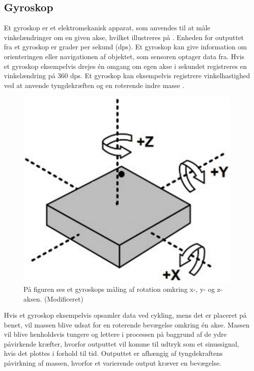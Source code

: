 \subsection{Gyroskop}
Et gyroskop er et elektromekanisk apparat, som anvendes til at måle vinkelændringer om en given akse, hvilket illustreres på . Enheden for outputtet fra et gyroskop er grader per sekund (dps). Et gyroskop kan give information om orienteringen eller navigationen af objektet, som sensoren optager data fra. Hvis et gyroskop eksempelvis drejes én omgang om egen akse i sekundet registreres en vinkelændring på 360 dps. \citep{Sparkfun_gyro,Barbour2014} \newline
Et gyroskop kan eksempelvis registrere vinkelhastighed ved at anvende tyngdekræften og en roterende indre masse \citep{Sparkfun_gyro,Barbour2014}.
\begin{figure}[H]
	\centering
	\includegraphics[scale=0.4]{figures/bProblemloesning/gyro.png}
	\caption{På figuren ses et gyroskops måling af rotation omkring x-, y- og z-aksen. \citep{Sparkfun_gyro} (Modificeret)}
	\label{fig:gyro}
\end{figure}\vspace{-.25cm}
Hvis et gyroskop eksempelvis opsamler data ved cykling, mens det er placeret på benet, vil massen blive udsat for en roterende bevægelse omkring én akse. Massen vil blive henholdsvis tungere og lettere i processen på baggrund af de ydre påvirkende kræfter, hvorfor outputtet vil komme til udtryk som et sinussignal, hvis det plottes i forhold til tid. Outputtet er afhængig af tyngdekraftens påvirkning af massen, hvorfor et varierende output kræver en bevægelse. \citep{TittertonWeston2004,LuingeVeltink2005}

